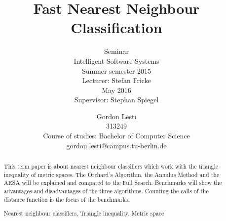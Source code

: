 \documentclass[runningheads,a4paper]{llncs}
\newcommand{\keywords}[1]{\par\addvspace\baselineskip
\noindent\keywordname\enspace\ignorespaces#1}
\begin{document}
\setlength{\tabcolsep}{12pt}

\mainmatter

\title{Fast Nearest Neighbour Classification}
\subtitle{\textnormal{\small{Seminar\\
Intelligent Software Systems\\
Summer semester 2015\\\vspace{1\baselineskip}
Lecturer: Stefan Fricke\\\vspace{2\baselineskip}
May 2016\\
Supervisor: Stephan Spiegel\\\vspace{1\baselineskip}}}}


\author{Gordon Lesti\\313249\\Course of studies: Bachelor of Computer Science\\gordon.lesti@campus.tu-berlin.de\\\vspace{5\baselineskip}}



\maketitle

\begin{abstract}
This term paper is about nearest neighbour classifiers which work with the triangle inequality of metric spaces. The
Orchard’s Algorithm, the Annulus Method and the AESA will be explained and compared to the Full Search.
Benchmarks will show the advantages and disadvantages of the three algorithms. Counting the calls of the distance
function is the focus of the benchmarks.
\keywords{Nearest neighbour classifiers, Triangle inequality, Metric space}
\end{abstract}
\end{document}
